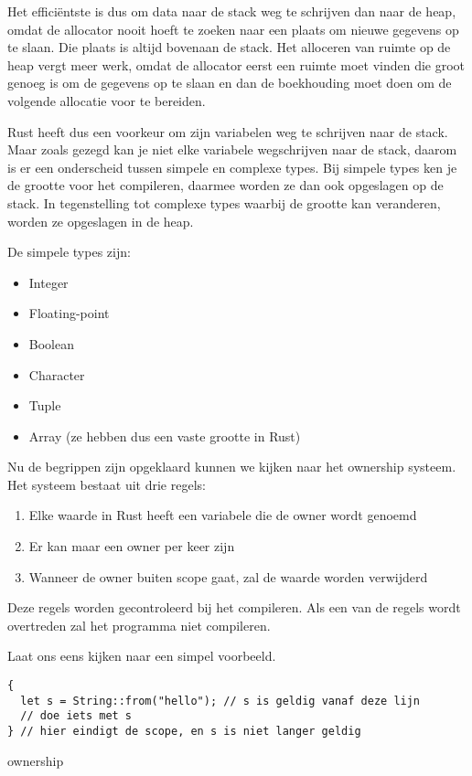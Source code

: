 Het efficiëntste is dus om data naar de stack weg te schrijven dan naar de heap, omdat de allocator
nooit hoeft te zoeken naar een plaats om nieuwe gegevens op te slaan. Die plaats is altijd bovenaan
de stack. Het alloceren van ruimte op de heap vergt meer werk, omdat de allocator eerst een ruimte
moet vinden die groot genoeg is om de gegevens op te slaan en dan de boekhouding moet doen om de
volgende allocatie voor te bereiden. 

Rust heeft dus een voorkeur om zijn variabelen weg te schrijven naar de stack. Maar zoals gezegd kan
je niet elke variabele wegschrijven naar de stack, daarom is er een onderscheid tussen simpele en
complexe types. Bij simpele types ken je de grootte voor het compileren, daarmee worden ze dan ook
opgeslagen op de stack. In tegenstelling tot complexe types waarbij de grootte kan veranderen,
worden ze opgeslagen in de heap.

De simpele types zijn:
\begin{itemize}
  \item Integer
  \item Floating-point
  \item Boolean
  \item Character
  \item Tuple
  \item Array (ze hebben dus een vaste grootte in Rust)
\end{itemize}

Nu de begrippen zijn opgeklaard kunnen we kijken naar het ownership systeem. Het systeem bestaat uit
drie regels: 
\begin{enumerate}
  \item Elke waarde in Rust heeft een variabele die de owner wordt genoemd 
  \item Er kan maar een owner per keer zijn 
  \item Wanneer de owner buiten scope gaat, zal de waarde worden verwijderd 
\end{enumerate}

Deze regels worden gecontroleerd bij het compileren. Als een van de regels wordt overtreden zal het
programma niet compileren.  

Laat ons eens kijken naar een simpel voorbeeld.

\begin{listing}[h]
\begin{verbatim}
{
  let s = String::from("hello"); // s is geldig vanaf deze lijn
  // doe iets met s
} // hier eindigt de scope, en s is niet langer geldig
\end{verbatim}
\caption{ownership}
\end{listing}

